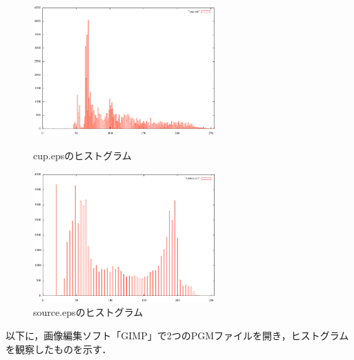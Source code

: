 \documentclass{jsarticle}
\begin{document}
\begin{figure}[htbp]
 \begin{minipage}{0.5\hsize}
  \begin{center}
   \includegraphics[width=70mm]{cup_histogram.png}
  \end{center}
  \caption{cup.epsのヒストグラム}
  \label{fig:three}
 \end{minipage}
 \begin{minipage}{0.5\hsize}
  \begin{center}
   \includegraphics[width=70mm]{source_histogram.png}
  \end{center}
  \caption{source.epsのヒストグラム}
  \label{fig:four}
 \end{minipage}
\end{figure}

\newpage

以下に，画像編集ソフト「GIMP」で2つのPGMファイルを開き，ヒストグラムを観察したものを示す．
\end{document}
